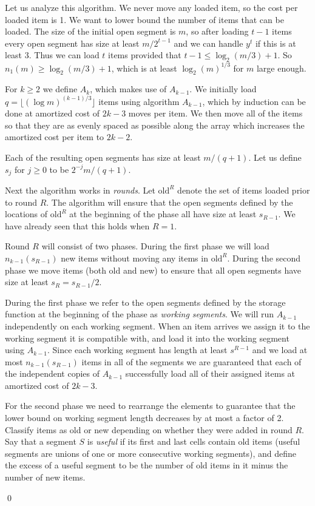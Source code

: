 \documentclass[unicode,review]{siamart1116}
\newenvironment{proofof}[1]{\noindent{\textbf { Proof of #1:}}} {{\qed}}
\def\old{{\mathrm{old}}}
\numberwithin{theorem}{section}
\begin{document}
\begin{proofof}{\Cref{thm:ub}}
Let us analyze this algorithm. We never move any loaded item, so the cost per loaded item  is 1.   We want to lower bound the number
of items that can be loaded.  The size of the initial open segment is $m$, so after loading $t-1$ items every open segment
has size at least $m/2^{t-1}$ and we can handle $y^t$ if this is at least 3.  Thus we can load $t$ items provided that
$t-1 \leq \log_2(m/3)+1$. So $n_1(m) \geq \log_2(m/3)+1$, which is at least $\log_2(m)^{1/3}$ for $m$ large enough.



For $k \geq 2$ we define $A_k$, which makes use of $A_{k-1}$.  We initially load $q=\lfloor (\log m)^{(k-1)/3} \rfloor$ 
items using algorithm $A_{k-1}$, which by induction can be done at amortized cost
of $2k-3$ moves per item.  We then move all of the items so that they are as evenly spaced as possible along the array which
increases the amortized cost per item to $2k-2$.

Each of the resulting open segments has size at least $m/(q+1)$.   Let us define
$s_j$ for $j \geq 0$ to be $2^{-j}m/(q+1)$.



Next the algorithm works in \emph{rounds}.  Let $\old^R$ denote the set of items loaded prior to round $R$.
The algorithm will ensure that the open segments defined by the locations of $\old^R$ at the beginning of the phase
all have size at least $s_{R-1}$.  We have already seen that this holds when $R=1$.  

Round $R$ will consist of two phases. During the first
phase we will load  $n_{k-1}(s_{R-1})$ new items without moving any items in $\old^R$.
During the second phase we move items (both old and new) to ensure that all open segments have size
at least $s_R=s_{R-1}/2$.



During the first phase we refer to the open segments defined by the storage function at the beginning of the phase
as {\em working segments}.  We will run $A_{k-1}$ independently on each working segment.  When an item arrives
we assign it to the working segment it is compatible with, and load it into the working segment using $A_{k-1}$.
Since each working segment has length at least $s^{R-1}$ and we load at most $n_{k-1}(s_{R-1})$
items in all of the segments we are guaranteed that each of the independent copies of $A_{k-1}$ successfully
load all of their assigned items at amortized cost of $2k-3$.  



For the second phase we need to rearrange the elements to guarantee that the lower bound on working
segment length decreases by at most a factor of 2.  Classify items as old or new depending on whether
they were added in round $R$.  Say that a segment $S$ is {\em useful} if its first and last cells contain
old items (useful segments are unions of one or more consecutive working segments), and define
the excess of a useful segment to be the number of old items in it minus the number of new items.


\end{proofof}
\end{document}
